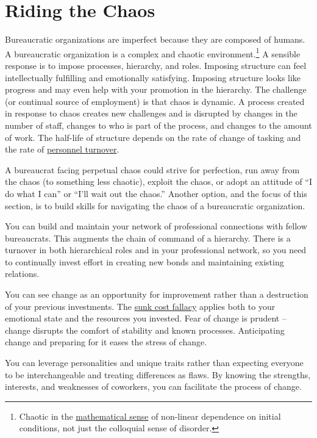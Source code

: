 \section{Riding the Chaos\label{sec:process-chaos}}

Bureaucratic organizations are imperfect because they are composed of humans. %
A bureaucratic organization is a complex and chaotic environment.\footnote{Chaotic in the \href{https://en.wikipedia.org/wiki/Chaos_theory}{mathematical sense} 
of non-linear dependence on initial conditions, not just the colloquial sense of disorder.} A sensible response is to impose processes, hierarchy, and roles. Imposing structure can feel intellectually fulfilling and emotionally satisfying. Imposing structure looks like progress and may even help with your promotion in the hierarchy. The challenge (or continual source of employment) is that chaos is dynamic. A process created in response to chaos creates new challenges and is disrupted by changes in the number of staff, changes to who is part of the process, and changes to the amount of work. The half-life of structure depends on the rate of change of tasking and the rate of 
%
\hyperref[sec:turnover]{personnel turnover}.

A bureaucrat facing perpetual chaos could strive for perfection, run away from the chaos (to something less chaotic), exploit the chaos, or adopt an attitude of ``I do what I can'' or ``I'll wait out the chaos.'' 
Another option, and the focus of this section, is to build skills for navigating the chaos of a bureaucratic organization.

You can build and maintain your network of professional connections with fellow bureaucrats. 
%
%
This augments the chain of command of a hierarchy. There is a turnover in both hierarchical roles and in your professional network, so you need to continually invest effort in creating new bonds and maintaining existing relations. 

You can see change as an opportunity for improvement rather than a destruction of your previous investments. The \href{https://en.wikipedia.org/wiki/Sunk_cost}{sunk cost fallacy}
applies both to your emotional state and the resources you invested. Fear of change is prudent -- change disrupts the comfort of stability and known processes. Anticipating change and preparing for it eases the stress of change.

You can leverage personalities and unique traits rather than expecting everyone to be interchangeable and treating differences as flaws. 
By knowing the strengths, interests, and weaknesses of coworkers, you can facilitate the process of change. 